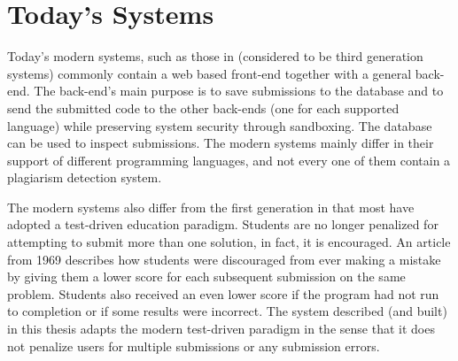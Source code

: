 \section{Today's Systems} \label{sec:todays_systems}
Today’s modern systems, such as those in \cite{Gradebot} \cite{Suleman} \cite{GenerationReview}  \cite{Kattis} \cite{Amelung} (considered to be third generation systems) commonly contain a web based front-end together with a general back-end. The back-end’s main purpose is to save submissions to the database and to send the submitted code to the other back-ends (one for each supported language) while preserving system security through sandboxing. The database can be used to inspect submissions. The modern systems mainly differ in their support of different programming languages, and not every one of them contain a plagiarism detection system.

The modern systems also differ from the first generation in that most have adopted a test-driven education paradigm. Students are no longer penalized for attempting to submit more than one solution, in fact, it is encouraged. An article from 1969 \cite{GradingScheme} describes how students were discouraged from ever making a mistake by giving them a lower score for each subsequent submission on the same problem. Students also received an even lower score if the program had not run to completion or if some results were incorrect. The system described (and built) in this thesis adapts the modern test-driven paradigm in the sense that it does not penalize users for multiple submissions or any submission errors.






